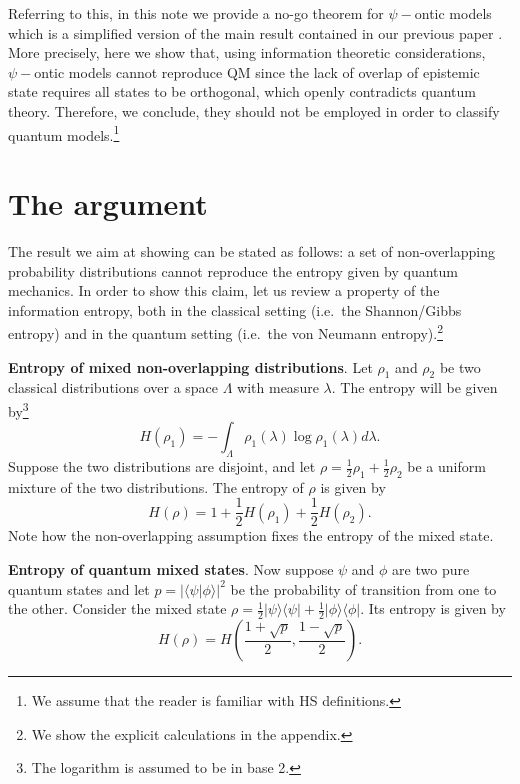 \documentclass[10pt,twocolumn, nofootinbib]{revtex4-1}
\begin{document}
Referring to this, in this note we provide a no-go theorem for $\psi-$ontic models which is a simplified version of the main result contained in our previous paper \cite{Carcassi:2022}. More precisely, here we show that, using information theoretic considerations, $\psi-$ontic models cannot reproduce QM since the lack of overlap of epistemic state requires all states to be orthogonal, which openly contradicts quantum theory. Therefore, we conclude, they should not be employed in order to classify quantum models.\footnote{We assume that the reader is familiar with HS definitions.} 

\section{The argument}

The result we aim at showing can be stated as follows: a set of non-overlapping probability distributions cannot reproduce the entropy given by quantum mechanics. In order to show this claim, let us review a property of the information entropy, both in the classical setting (i.e.\ the Shannon/Gibbs entropy) and in the quantum setting (i.e.\ the von Neumann entropy).\footnote{We show the explicit calculations in the appendix.}

\textbf{Entropy of mixed non-overlapping distributions}. Let $\rho_1$ and $\rho_2$ be two classical distributions over a space $\Lambda$ with measure $\lambda$. The entropy will be given by\footnote{The logarithm is assumed to be in base 2.}
\begin{equation}\label{shannon_entropy}
	H(\rho_1) = - \int_\Lambda \rho_1(\lambda) \log \rho_1(\lambda) d\lambda.
\end{equation}
Suppose the two distributions are disjoint, and let $\rho = \frac{1}{2} \rho_1 + \frac{1}{2} \rho_2$ be a uniform mixture of the two distributions. The entropy of $\rho$ is given by
\begin{equation}\label{entropy_nonoverlap}
	H(\rho) = 1 + \frac{1}{2} H(\rho_1) + \frac{1}{2} H(\rho_2).
\end{equation}
Note how the non-overlapping assumption fixes the entropy of the mixed state.

\textbf{Entropy of quantum mixed states}. Now suppose $\psi$ and $\phi$ are two pure quantum states and let $p = | \langle \psi | \phi \rangle |^2$ be the probability of transition from one to the other. Consider the mixed state $\rho = \frac{1}{2} | \psi \rangle \langle \psi | + \frac{1}{2} | \phi \rangle \langle \phi |$. Its entropy is given by
\begin{equation}\label{entropy_mixed}
	H(\rho) = H\left(\frac{1+\sqrt{p}}{2}, \frac{1-\sqrt{p}}{2}\right).
\end{equation}
\end{document}
